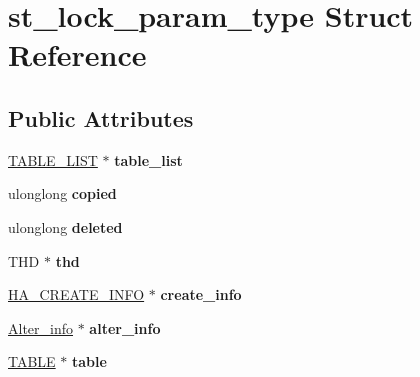 \hypertarget{structst__lock__param__type}{}\section{st\+\_\+lock\+\_\+param\+\_\+type Struct Reference}
\label{structst__lock__param__type}
\subsection*{Public Attributes}
\begin{DoxyCompactItemize}
\item 
\mbox{\label{structst__lock__param__type_a457178f314b64745bf9c1aa09669f501}} 
\mbox{\hyperlink{structTABLE__LIST}{T\+A\+B\+L\+E\+\_\+\+L\+I\+ST}} $\ast$ {\bfseries table\+\_\+list}
\item 
\mbox{\label{structst__lock__param__type_af6ce40c1e14f233d2dfd780184fe1ca0}} 
ulonglong {\bfseries copied}
\item 
\mbox{\label{structst__lock__param__type_aad6fe2ff958b16fd4ed8d757cad9b80d}} 
ulonglong {\bfseries deleted}
\item 
\mbox{\label{structst__lock__param__type_af2ee4d6e0b623e24a973e2d23174ad78}} 
T\+HD $\ast$ {\bfseries thd}
\item 
\mbox{\label{structst__lock__param__type_abd399a00a66353018626fafa70fc50a8}} 
\mbox{\hyperlink{structst__ha__create__information}{H\+A\+\_\+\+C\+R\+E\+A\+T\+E\+\_\+\+I\+N\+FO}} $\ast$ {\bfseries create\+\_\+info}
\item 
\mbox{\label{structst__lock__param__type_aa64038e75f41ecae0174fe2bb8d514fd}} 
\mbox{\hyperlink{classAlter__info}{Alter\+\_\+info}} $\ast$ {\bfseries alter\+\_\+info}
\item 
\mbox{\label{structst__lock__param__type_a6042457fb4dd468391cf96790cde4082}} 
\mbox{\hyperlink{structTABLE}{T\+A\+B\+LE}} $\ast$ {\bfseries table}
\item 
\mbox{\label{structst__lock__param__type_a331e4f6e1b01221929892f8167c3c110}} 

\end{DoxyCompactItemize}
